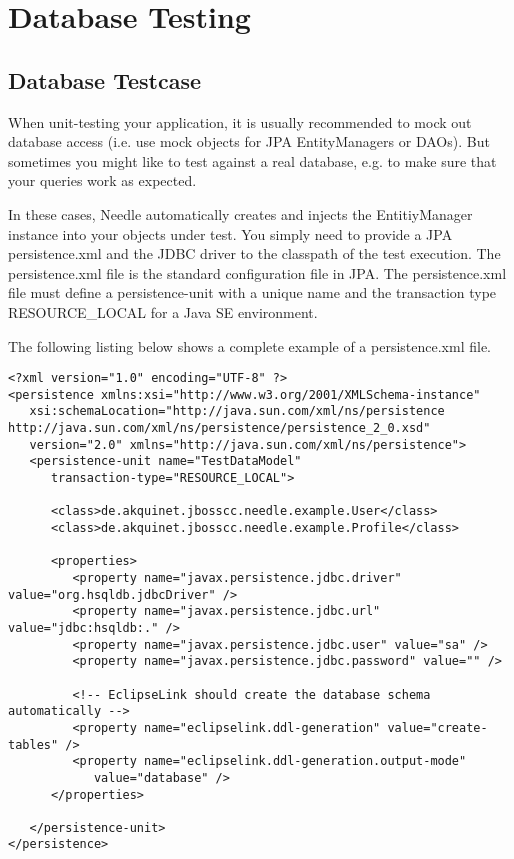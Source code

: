 \chapter{Database Testing}

\section{Database Testcase}

When unit-testing your application, it is usually recommended to mock out database access (i.e. use mock objects for JPA EntityManagers or DAOs). But sometimes you might like to test against a real database, e.g. to make sure that your queries work as expected. 

In these cases, Needle automatically creates and injects the EntitiyManager instance into your objects under test. You simply need to provide a JPA persistence.xml and the JDBC driver to the classpath of the test execution. The persistence.xml file is the standard configuration file in JPA. The persistence.xml file must define a persistence-unit with a unique name and the transaction type RESOURCE\_LOCAL for a Java SE environment. 

The following listing below shows a complete example of a persistence.xml file. 

\begin{lstlisting}[caption=test persistence.xml]
<?xml version="1.0" encoding="UTF-8" ?>
<persistence xmlns:xsi="http://www.w3.org/2001/XMLSchema-instance"
   xsi:schemaLocation="http://java.sun.com/xml/ns/persistence http://java.sun.com/xml/ns/persistence/persistence_2_0.xsd"
   version="2.0" xmlns="http://java.sun.com/xml/ns/persistence">
   <persistence-unit name="TestDataModel"
      transaction-type="RESOURCE_LOCAL">

      <class>de.akquinet.jbosscc.needle.example.User</class>
      <class>de.akquinet.jbosscc.needle.example.Profile</class>

      <properties>
         <property name="javax.persistence.jdbc.driver" value="org.hsqldb.jdbcDriver" />
         <property name="javax.persistence.jdbc.url" value="jdbc:hsqldb:." />
         <property name="javax.persistence.jdbc.user" value="sa" />
         <property name="javax.persistence.jdbc.password" value="" />

         <!-- EclipseLink should create the database schema automatically -->
         <property name="eclipselink.ddl-generation" value="create-tables" />
         <property name="eclipselink.ddl-generation.output-mode"
            value="database" />
      </properties>

   </persistence-unit>
</persistence>
\end{lstlisting}

